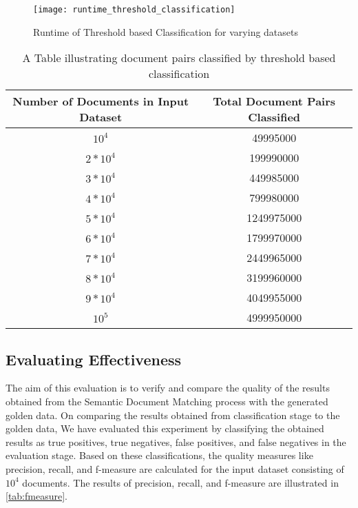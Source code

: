 \begin{figure}[htbp]
	\centering
		\texttt{[image: runtime\_threshold\_classification]}
	\caption{Runtime of Threshold based Classification for varying datasets}
	\label{fig: result_runtime_classification}
\end{figure}

\begin{table}[htbp]
	\centering
		\begin{tabular}{cc}\toprule
		Number of Documents in Input Dataset & Total Document Pairs Classified\\\midrule
		\(10^4\) & 49995000 \\\addlinespace 
		\(2*10^4\)  &  199990000 \\\addlinespace
        \(3*10^4\)  &  449985000 \\\addlinespace
        \(4*10^4\)  &  799980000 \\\addlinespace
        \(5*10^4\)  &  1249975000 \\\addlinespace
        \(6*10^4\)  &  1799970000 \\\addlinespace
        \(7*10^4\)  &  2449965000 \\\addlinespace
        \(8*10^4\)  &  3199960000\\\addlinespace
        \(9*10^4\)  &  4049955000 \\\addlinespace
        \(10^5\)  &  4999950000 \\\bottomrule
		\end{tabular}
	\caption{A Table illustrating document pairs classified by threshold based classification}
	\label{tab:document pairs classified by threshold based classification}
\end{table}


\subsection{Evaluating Effectiveness}
\label{subsection: evaluating effectiveness}

The aim of this evaluation is to verify and compare the quality of the results obtained from the Semantic Document Matching process with the generated golden data. On comparing the results obtained from classification stage to the golden data, We have evaluated this experiment by classifying the obtained results as true positives, true negatives, false positives, and false negatives in the evaluation stage. Based on these classifications, the quality measures like precision, recall, and f-measure are calculated for the input dataset consisting of \(10^4\) documents. The results of precision, recall, and f-measure are illustrated in \ref{tab:fmeasure}. 

